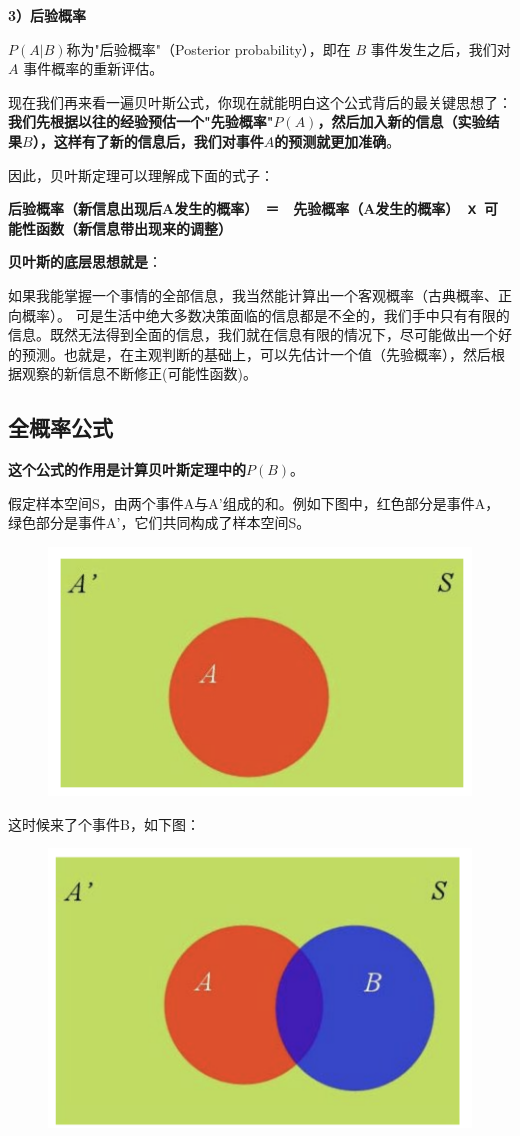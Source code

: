 \documentclass[12pt]{article}
\begin{document}
\textbf{3）后验概率}

$P(A|B)$称为"后验概率"（Posterior probability），即在 $B$ 事件发生之后，我们对 $A$ 事件概率的重新评估。

现在我们再来看一遍贝叶斯公式，你现在就能明白这个公式背后的最关键思想了：\textbf{我们先根据以往的经验预估一个"先验概率"$P(A)$，然后加入新的信息（实验结果$B$），这样有了新的信息后，我们对事件$A$的预测就更加准确}。

因此，贝叶斯定理可以理解成下面的式子：

\textbf{后验概率（新信息出现后A发生的概率）　＝　先验概率（A发生的概率） ｘ 可能性函数（新信息带出现来的调整）}

\textbf{贝叶斯的底层思想就是}：

如果我能掌握一个事情的全部信息，我当然能计算出一个客观概率（古典概率、正向概率）。
可是生活中绝大多数决策面临的信息都是不全的，我们手中只有有限的信息。既然无法得到全面的信息，我们就在信息有限的情况下，尽可能做出一个好的预测。也就是，在主观判断的基础上，可以先估计一个值（先验概率），然后根据观察的新信息不断修正(可能性函数)。

\subsection{\textbf{全概率公式}}
\textbf{这个公式的作用是计算贝叶斯定理中的$P(B)$}。

假定样本空间S，由两个事件A与A'组成的和。例如下图中，红色部分是事件A，绿色部分是事件A'，它们共同构成了样本空间S。
\begin{figure}[H]
    \centering
    \includegraphics[width=.5\textwidth]{fig/Bayesian_Example_1.png}
\end{figure}

这时候来了个事件B，如下图：
\begin{figure}[H]
    \centering
    \includegraphics[width=.5\textwidth]{fig/Bayesian_Example_2.png}
\end{figure}
\end{document}
